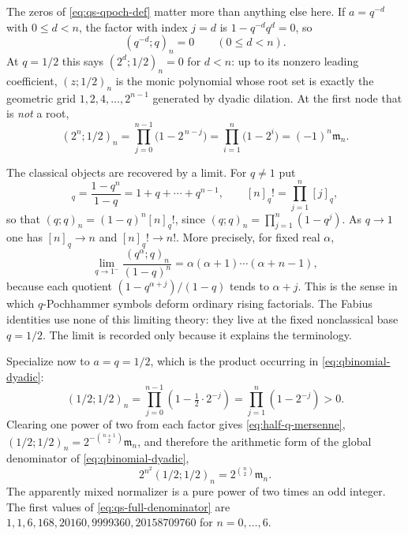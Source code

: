 \documentclass[11pt,oneside]{article}
\theoremstyle{definition}
\theoremstyle{remark}
\begin{document}
The zeros of \eqref{eq:qs-qpoch-def} matter more than anything else here.  If $a=q^{-d}$
with $0\le d<n$, the factor with index $j=d$ is $1-q^{-d}q^{d}=0$, so
\begin{equation}
 (q^{-d};q)_n=0\qquad(0\le d<n).                          \label{eq:qs-vanishing}
\end{equation}
At $q=1/2$ this says $(2^d;1/2)_n=0$ for $d<n$: up to its nonzero leading coefficient,
$(z;1/2)_n$ is the monic polynomial whose root set is exactly the geometric grid
$1,2,4,\ldots,2^{n-1}$ generated by dyadic dilation.  At the first node that is \emph{not} a
root,
\begin{equation}
 (2^n;1/2)_n=\prod_{j=0}^{n-1}\bigl(1-2^{\,n-j}\bigr)
 =\prod_{i=1}^{n}\bigl(1-2^{i}\bigr)=(-1)^n\mathfrak m_n. \label{eq:qs-endpoint-value}
\end{equation}

The classical objects are recovered by a limit.  For $q\ne1$ put
\begin{equation}
 [n]_q=\frac{1-q^n}{1-q}=1+q+\cdots+q^{n-1},
 \qquad
 [n]_q!=\prod_{j=1}^{n}[j]_q,                             \label{eq:qs-q-integer}
\end{equation}
so that $(q;q)_n=(1-q)^n[n]_q!$, since $(q;q)_n=\prod_{j=1}^{n}(1-q^j)$.  As $q\to1$ one has
$[n]_q\to n$ and $[n]_q!\to n!$.  More precisely, for fixed real $\alpha$,
\begin{equation}
 \lim_{q\to1^-}\frac{(q^{\alpha};q)_n}{(1-q)^n}
 =\alpha(\alpha+1)\cdots(\alpha+n-1),                     \label{eq:qs-classical-limit}
\end{equation}
because each quotient $(1-q^{\alpha+j})/(1-q)$ tends to $\alpha+j$.  This is the sense in
which $q$-Pochhammer symbols deform ordinary rising factorials.  The Fabius identities use
none of this limiting theory: they live at the fixed nonclassical base $q=1/2$.  The limit is
recorded only because it explains the terminology.

Specialize now to $a=q=1/2$, which is the product occurring in \eqref{eq:qbinomial-dyadic}:
\begin{equation}
 (1/2;1/2)_n=\prod_{j=0}^{n-1}\left(1-\tfrac12\cdot2^{-j}\right)
 =\prod_{j=1}^{n}\left(1-2^{-j}\right)>0.                 \label{eq:qs-half-poch}
\end{equation}
Clearing one power of two from each factor gives \eqref{eq:half-q-mersenne},
$(1/2;1/2)_n=2^{-\binom{n+1}{2}}\mathfrak m_n$, and therefore the arithmetic form of the
global denominator of \eqref{eq:qbinomial-dyadic},
\begin{equation}
 2^{n^2}(1/2;1/2)_n=2^{\binom n2}\mathfrak m_n.           \label{eq:qs-full-denominator}
\end{equation}
The apparently mixed normalizer is a pure power of two times an odd integer.  The first
values of \eqref{eq:qs-full-denominator} are $1,1,6,168,20160,9999360,20158709760$ for
$n=0,\ldots,6$.
\end{document}
